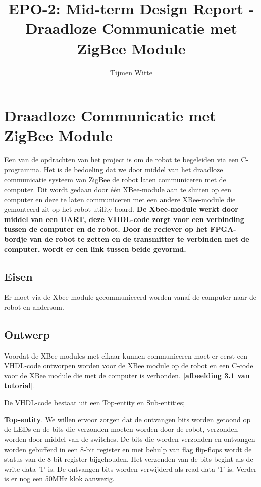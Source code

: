 \documentclass{report}
\title{EPO-2: Mid-term Design Report - Draadloze Communicatie met ZigBee Module}
\author{Tijmen Witte}
\begin{document}
\section{Draadloze Communicatie met ZigBee Module}

Een van de opdrachten van het project is om de robot te begeleiden via een C-programma.
Het is de bedoeling dat we door middel van het draadloze communicatie systeem van ZigBee de robot laten communiceren met de computer.
Dit wordt gedaan door één XBee-module aan te sluiten op een computer en deze te laten communiceren met een andere XBee-module die  gemonteerd zit op het robot utility board.
\newline
\textbf{De Xbee-module werkt door middel van een UART, deze VHDL-code zorgt voor een verbinding tussen de computer en de robot. Door de reciever op het FPGA-bordje van de robot te zetten en de transmitter te verbinden met de computer, wordt er een link tussen beide gevormd.}


\subsection{Eisen}

Er moet via de Xbee module gecommuniceerd worden vanaf de computer naar de robot en andersom.


\subsection{Ontwerp}
Voordat de XBee modules met elkaar kunnen communiceren moet er eerst een VHDL-code ontworpen worden voor de XBee module op de robot en een C-code voor de XBee module die met de computer is verbonden.
\textbf{[afbeelding 3.1 van tutorial]}.
\newline

De VHDL-code bestaat uit een Top-entity en Sub-entities;
\newline

\textbf{Top-entity}.
\newline
We willen ervoor zorgen dat de ontvangen bits worden getoond op de LEDs en de bits die verzonden moeten worden door de robot, verzonden worden door middel van de switches.
De bits die worden verzonden en ontvangen worden gebufferd in een 8-bit register en met behulp van flag flip-flops wordt de status van de 8-bit register bijgehouden.
Het verzenden van de bits begint als de write-data '1' is.
De ontvangen bits worden verwijderd als read-data '1' is.
Verder is er nog een 50MHz klok aanwezig.
\newline
\end{document}
